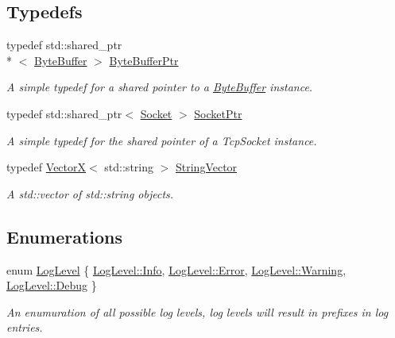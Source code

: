 \subsection*{Typedefs}
\begin{DoxyCompactItemize}
\item 
typedef std\-::shared\-\_\-ptr\\*
$<$ \hyperlink{class_senergy_1_1_byte_buffer}{Byte\-Buffer} $>$ \hyperlink{namespace_senergy_a30f5cfaeb333ffdf2c3332cc590a57ea}{Byte\-Buffer\-Ptr}
\begin{DoxyCompactList}\small\item\em A simple typedef for a shared pointer to a \hyperlink{class_senergy_1_1_byte_buffer}{Byte\-Buffer} instance. \end{DoxyCompactList}\item 
typedef std\-::shared\-\_\-ptr$<$ \hyperlink{class_senergy_1_1_socket}{Socket} $>$ \hyperlink{namespace_senergy_a9014e48a368555ba932efd8d17eb2d23}{Socket\-Ptr}
\begin{DoxyCompactList}\small\item\em A simple typedef for the shared pointer of a Tcp\-Socket instance. \end{DoxyCompactList}\item 
typedef \hyperlink{class_senergy_1_1_vector_x}{Vector\-X}$<$ std\-::string $>$ \hyperlink{namespace_senergy_a09aea2e19671645414361ca8388aebfe}{String\-Vector}
\begin{DoxyCompactList}\small\item\em A std\-::vector of std\-::string objects. \end{DoxyCompactList}\end{DoxyCompactItemize}
\subsection*{Enumerations}
\begin{DoxyCompactItemize}
\item 
enum \hyperlink{namespace_senergy_a8a440a300c8ecafb12b81c1853a5c66d}{Log\-Level} \{ \hyperlink{namespace_senergy_a8a440a300c8ecafb12b81c1853a5c66da4059b0251f66a18cb56f544728796875}{Log\-Level\-::\-Info}, 
\hyperlink{namespace_senergy_a8a440a300c8ecafb12b81c1853a5c66da902b0d55fddef6f8d651fe1035b7d4bd}{Log\-Level\-::\-Error}, 
\hyperlink{namespace_senergy_a8a440a300c8ecafb12b81c1853a5c66da0eaadb4fcb48a0a0ed7bc9868be9fbaa}{Log\-Level\-::\-Warning}, 
\hyperlink{namespace_senergy_a8a440a300c8ecafb12b81c1853a5c66daa603905470e2a5b8c13e96b579ef0dba}{Log\-Level\-::\-Debug}
 \}
\begin{DoxyCompactList}\small\item\em An enumuration of all possible log levels, log levels will result in prefixes in log entries. \end{DoxyCompactList}\end{DoxyCompactItemize}


